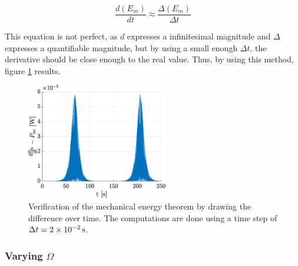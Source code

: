 \documentclass[a4paper,12pt,twoside]{article}
\begin{document}
\begin{equation}
	\frac{d(E_m)}{dt} \approx \frac{\Delta(E_m)}{\Delta t}
	\label{eq:almost-derivative}
\end{equation}

This equation is not perfect, as $d$ expresses a infinitesimal magnitude and $\Delta$ expresses a quantifiable magnitude, but by using a small enough $\Delta t$, the derivative should be close enough to the real value.
Thus, by using this method, figure \ref{fig:c-thm} results.

\begin{figure}[h!]
	\centering
	\includegraphics[width=0.55\textwidth]{graphs/c_thm.eps}
	\caption{Verification of the mechanical energy theorem by drawing the difference over time. The computations are done using a time step of $\Delta t = \SI{2d-2}{\s}$.}
	\label{fig:c-thm}
\end{figure}


\subsubsection{Varying $\Omega$}
\end{document}
